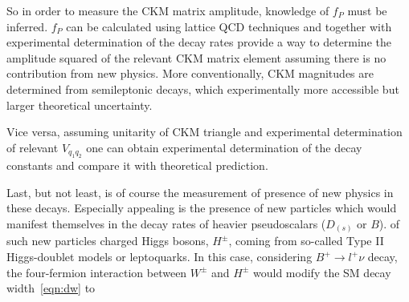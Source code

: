So in order to measure the \gls{CKM} matrix amplitude, knowledge of $f_{P}$ must be inferred. $f_{P}$ can be calculated using lattice \gls{QCD} techniques and together with experimental determination of the decay rates provide a way to determine the amplitude squared of the relevant \gls{CKM} matrix element assuming there is no contribution from new physics. More conventionally, \gls{CKM} magnitudes are determined from semileptonic decays, which \DIFdelbegin {}\DIFdelend \DIFaddbegin {}\DIFaddend experimentally 
more accessible but \DIFdelbegin {}\DIFdelend \DIFaddbegin {}\DIFaddend larger theoretical uncertainty.

Vice versa, assuming unitarity of \DIFaddbegin {}\DIFaddend \gls{CKM} triangle and experimental determination of \DIFaddbegin {}\DIFaddend relevant $V_{q_{1}q_{2}}$ one can obtain experimental determination of the decay constants and compare it with theoretical prediction.

Last, but not least, is of course the measurement of presence of new physics in these decays. Especially appealing is the presence of new particles which would manifest themselves in the decay rates of heavier pseudoscalars ($D_{(s)}$ or $B$). \DIFdelbegin {}\DIFdelend \DIFaddbegin {}\DIFaddend of such new particles \DIFdelbegin {}\DIFdelend \DIFaddbegin {}\DIFaddend charged Higgs bosons, $H^{\pm}$, coming from so-called Type II Higgs-doublet models \cite{Hou:1992sy}\cite{Akeroyd:2003zr}\cite{Dobrescu:2008er} or leptoquarks\cite{Dobrescu:2008er}. In this case, considering $B^{+}\rightarrow l^{+}\nu$ decay, the four-fermion interaction between \DIFaddbegin {}\DIFaddend $W^{\pm}$ and $H^{\pm}$ \DIFaddbegin {}\DIFaddend would modify the \gls{SM} decay width~\autoref{eqn:dw} to

